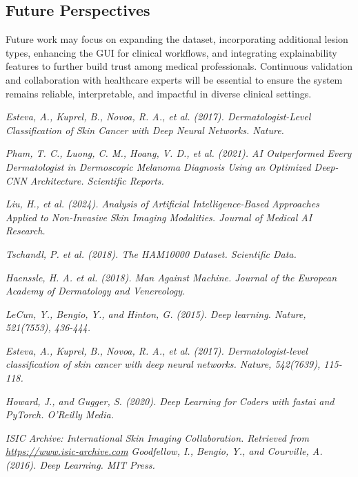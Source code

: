 \documentclass[a4paper,12pt]{report}
\begin{document}
\begin{spacing}{1.5}
    \section*{Future Perspectives}
    
    Future work may focus on expanding the dataset, incorporating additional lesion types, enhancing the GUI for clinical workflows, and integrating explainability features to further build trust among medical professionals. Continuous validation and collaboration with healthcare experts will be essential to ensure the system remains reliable, interpretable, and impactful in diverse clinical settings.

\newpage

\begin{thebibliography}{99}


 \emph{Esteva, A., Kuprel, B., Novoa, R. A., et al. (2017). Dermatologist-Level Classification of Skin Cancer with Deep Neural Networks. Nature.}

 \emph{Pham, T. C., Luong, C. M., Hoang, V. D., et al. (2021). AI Outperformed Every Dermatologist in Dermoscopic Melanoma Diagnosis Using an Optimized Deep-CNN Architecture. Scientific Reports.}

 \emph{Liu, H., et al. (2024). Analysis of Artificial Intelligence-Based Approaches Applied to Non-Invasive Skin Imaging Modalities. Journal of Medical AI Research.}

 \emph{Tschandl, P. et al. (2018). The HAM10000 Dataset. Scientific Data.}

 \emph{Haenssle, H. A. et al. (2018). Man Against Machine. Journal of the European Academy of Dermatology and Venereology.}

 \emph{LeCun, Y., Bengio, Y., and Hinton, G. (2015). Deep learning. Nature, 521(7553), 436-444.}

 \emph{Esteva, A., Kuprel, B., Novoa, R. A., et al. (2017). Dermatologist-level classification of skin cancer with deep neural networks. Nature, 542(7639), 115-118.}

 \emph{Howard, J., and Gugger, S. (2020). Deep Learning for Coders with fastai and PyTorch. O'Reilly Media.}

 \emph{ISIC Archive: International Skin Imaging Collaboration. Retrieved from \url{https://www.isic-archive.com}}
 \emph{Goodfellow, I., Bengio, Y., and Courville, A. (2016). Deep Learning. MIT Press.}


\end{thebibliography}
\end{spacing}
\end{document}
